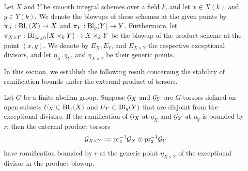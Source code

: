 Let $X$ and $Y$ be smooth integral schemes over a field $k$, and let
$x\in X(k)$ and $y\in Y(k)$.
We denote the blowups of these schemes at the given points by 
$\pi_X: \operatorname{Bl}_x(X) \to X$ and $\pi_Y: \operatorname{Bl}_y(Y) \to Y$. Furthermore, let $\pi_{X \times Y}: \operatorname{Bl}_{(x,y)}(X \times_k Y) \to X \times_k Y$ 
be the blowup of the product scheme at the point $(x,y)$.
We denote by $E_X, E_Y$, and $E_{X \times Y}$ the respective exceptional divisors, and let $\eta_X, \eta_Y$, and $\eta_{X \times Y}$ be their generic points.

In this section, we establish the following result concerning the stability of ramification bounds under the external product of torsors.

\begin{prop}\label{prop:ramification-external-product}
Let $G$ be a finite abelian group. Suppose $\mathcal{G}_X$ and $\mathcal{G}_Y$ are $G$-torsors defined on open subsets $U_X \subset \operatorname{Bl}_x(X)$ and $U_Y \subset \operatorname{Bl}_y(Y)$ that are disjoint
from the exceptional divisors.
If the ramification of $\mathcal{G}_X$ at $\eta_X$ and $\mathcal{G}_Y$ at $\eta_Y$ is bounded by $r$, then the external product torsors
\[
\mathcal{G}_{X \times Y} := \text{pr}_1^{-1} \mathcal{G}_X \otimes \text{pr}_2^{-1} \mathcal{G}_Y
\]
have ramification bounded by $r$ at the generic point $\eta_{X\times Y}$ of the exceptional divisor in the product blowup.
\end{prop}

